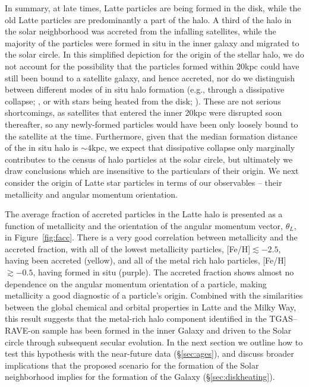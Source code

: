 \documentclass[apj, twocolappendix, numberedappendix, appendixfloats]{emulateapj}
\begin{document}
In summary, at late times, Latte particles are being formed in the disk, while the old Latte particles are predominantly a part of the halo.
A third of the halo in the solar neighborhood was accreted from the infalling satellites, while the majority of the particles were formed in situ in the inner galaxy and migrated to the solar circle.
In this simplified depiction for the origin of the stellar halo, we do not account for the possibility that the particles formed within 20\;kpc could have still been bound to a satellite galaxy, and hence accreted, nor do we distinguish between different modes of in situ halo formation (e.g., through a dissipative collapse; \citealt{samland2003}, or with stars being heated from the disk; \citealt{purcell2010}).
These are not serious shortcomings, as satellites that entered the inner 20\;kpc were disrupted soon thereafter, so any newly-formed particles would have been only loosely bound to the satellite at the time.
Furthermore, given that the median formation distance of the in situ halo is $\sim4$\;kpc, we expect that dissipative collapse only marginally contributes to the census of halo particles at the solar circle, but ultimately we draw conclusions which are insensitive to the particulars of their origin.
We next consider the origin of Latte star particles in terms of our observables -- their metallicity and angular momentum orientation.

The average fraction of accreted particles in the Latte halo is presented as a function of metallicity and the orientation of the angular momentum vector, $\theta_L$, in Figure~\ref{fig:facc}.
There is a very good correlation between metallicity and the accreted fraction, with all of the lowest metallicity particles, [Fe/H]$\lesssim-2.5$, having been accreted (yellow), and all of the metal rich halo particles, [Fe/H]$\gtrsim-0.5$, having formed in situ (purple).
The accreted fraction shows almost no dependence on the angular momentum orientation of a particle, making metallicity a good diagnostic of a particle's origin.
Combined with the similarities between the global chemical and orbital properties in Latte and the Milky Way, this result suggests that the metal-rich halo component identified in the TGAS--RAVE-on sample has been formed in the inner Galaxy and driven to the Solar circle through subsequent secular evolution.
In the next section we outline how to test this hypothesis with the near-future data (\S\ref{sec:ages}), and discuss broader implications that the proposed scenario for the formation of the Solar neighborhood implies for the formation of the Galaxy (\S\ref{sec:diskheating}).
\end{document}
